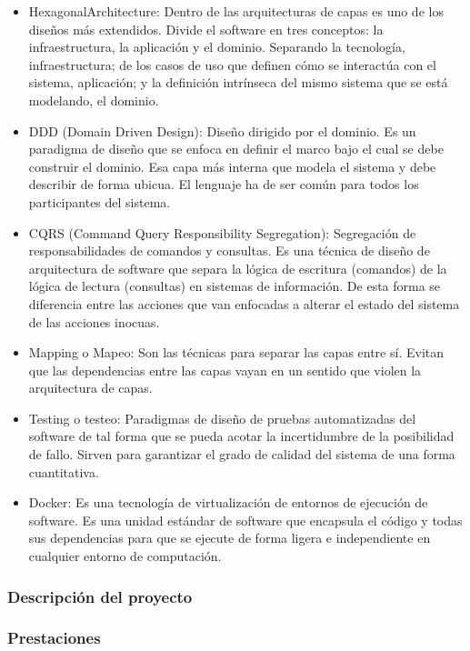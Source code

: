 \begin{itemize}
    \item \gls{HexagonalArchitecture}: Dentro de las arquitecturas de capas es uno de los diseños más extendidos.
    Divide el software en tres conceptos: la infraestructura, la aplicación y el dominio.
    Separando la tecnología, infraestructura;
    de los casos de uso que definen cómo se interactúa con el sistema, aplicación;
    y la definición intrínseca del mismo sistema que se está modelando, el dominio.
    \item \gls{DDD} (Domain Driven Design): Diseño dirigido por el dominio.
    Es un paradigma de diseño que se enfoca en definir el marco bajo el cual se debe construir el dominio.
    Esa capa más interna que modela el sistema y debe describir de forma ubicua.
    El lenguaje ha de ser común para todos los participantes del sistema.
    \item \gls{CQRS} (Command Query Responsibility Segregation): Segregación de responsabilidades de comandos y consultas.
    Es una técnica de diseño de arquitectura de software que separa la lógica de escritura (comandos) de la lógica de lectura (consultas) en sistemas de información.
    De esta forma se diferencia entre las acciones que van enfocadas a alterar el estado del sistema de las acciones inocuas.
    \item Mapping o Mapeo:
    Son las técnicas para separar las capas entre sí.
    Evitan que las dependencias entre las capas vayan en un sentido que violen la arquitectura de capas.
    \item Testing o testeo:
    Paradigmas de diseño de pruebas automatizadas del software de tal forma que se pueda acotar la incertidumbre de la posibilidad de fallo.
    Sirven para garantizar el grado de calidad del sistema de una forma cuantitativa.
    \item Docker:
    Es una tecnología de virtualización de entornos de ejecución de software.
    Es una unidad estándar de software que encapsula el código y todas sus dependencias para que se ejecute de forma ligera e independiente en cualquier entorno de computación.
\end{itemize}



\subsubsection{Descripción del proyecto}


\subsubsection{Prestaciones}


